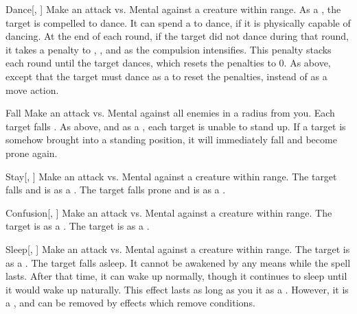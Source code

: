 \begin{ability}[\nth{1}]{Dance}[, ]
Make an attack vs. Mental against a creature within \rngmed range.
\hit As a , the target is compelled to dance.
It can spend a  to dance, if it is physically capable of dancing.
At the end of each round, if the target did not dance during that round, it takes a  penalty to , , and  as the compulsion intensifies.
This penalty stacks each round until the target dances, which resets the penalties to 0.
\crit As above, except that the target must dance as a  to reset the penalties, instead of as a move action.
\end{ability}
\vspace{0.25em}


\begin{ability}[\nth{1}]{Fall}
Make an attack vs. Mental against all enemies in a \areamed radius from you.
\hit Each target falls .
\crit As above, and as a , each target is unable to stand up.
If a target is somehow brought into a standing position, it will immediately fall and become prone again.
\end{ability}
\vspace{0.25em}


\begin{ability}[\nth{2}]{Stay}[, ]
Make an attack vs. Mental against a creature within \rngmed range.
\hit The target falls  and is  as a .
\crit The target falls prone and is  as a .
\end{ability}
\vspace{0.25em}


\begin{ability}[\nth{3}]{Confusion}[, ]
Make an attack vs. Mental against a creature within \rngmed range.
\hit The target is \disoriented as a .
\crit The target is \confused as a .
\end{ability}
\vspace{0.25em}


\begin{ability}[\nth{3}]{Sleep}[, ]
Make an attack vs. Mental against a creature within \rngclose range.
\hit The target is \blinded as a .
\crit The target falls asleep.
It cannot be awakened by any means while the spell lasts.
After that time, it can wake up normally, though it continues to sleep until it would wake up naturally.
This effect lasts as long as you  it as a .
However, it is a , and can be removed by effects which remove conditions.
\end{ability}
\vspace{0.25em}


